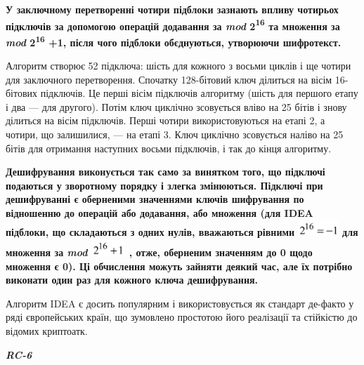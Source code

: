 \bigskip

{\bfseries
\textmd{У заключному перетворенні  чотири підблоки зазнають впливу чотирьох
підключів за допомогою операцій }\textmd{додавання за
}\textmd{\textit{mod}}\textmd{\textit{
}}\textmd{2}\textmd{\textsuperscript{16}}\textit{  }\textmd{та
}\textmd{множення за }\textmd{\textit{mod}}\textmd{
}\textmd{2}\textmd{\textsuperscript{16}}\textmd{ +1, після чого підблоки
об{\textquotesingle}єднуються, утворюючи шифротекст.}}

Алгоритм створює 52 підключа: шість для кожного з восьми циклів і ще чотири для
заключного перетворення. Спочатку 128-бітовий ключ ділиться на вісім 16-бітових
підключів. Це перші вісім підключів алгоритму (шість для першого етапу і два ---
для другого). Потім ключ циклічно зсовується вліво на 25 бітів і знову ділиться
на вісім підключів. Перші чотири використовуються на етапі 2, а чотири, що
залишилися, --- на етапі 3. Ключ циклічно зсовується наліво на 25 бітів для
отримання наступних восьми підключів, і так до кінця алгоритму.

{\bfseries
\textmd{Дешифрування виконується так само за винятком того, що
}\textmd{підключі}\textmd{ подаються у зворотному порядку і злегка змінюються. 
Підключі  при  дешифруванні  є  оберненими  значеннями  ключів  шифрування  по
відношенню до  операцій  або  додавання,  або  множення (для  IDEA  підблоки, 
що складаються  з  одних  нулів, вважаються рівними }
\includegraphics[width=0.5965in,height=0.2362in]{crypt-img/crypt-img302.png}
\textmd{ для множення за  }\textmd{\textit{mod}}\textmd{ }
\includegraphics[width=0.5043in,height=0.252in]{crypt-img/crypt-img303.png}
\textmd{, отже, оберненим значенням до }\textmd{0 }\textmd{щодо множення є 0).
Ці обчислення можуть зайняти деякий час, але їх потрібно виконати один раз для 
кожного  ключа  дешифрування.  }}


\bigskip

Алгоритм IDEA є досить популярним і використовується як стандарт де-факто у ряді
європейських країн, що зумовлено простотою його реалізації та стійкістю до
відомих криптоатк.


\bigskip


\bigskip

{\centering\bfseries\itshape
RC-6
\par}


